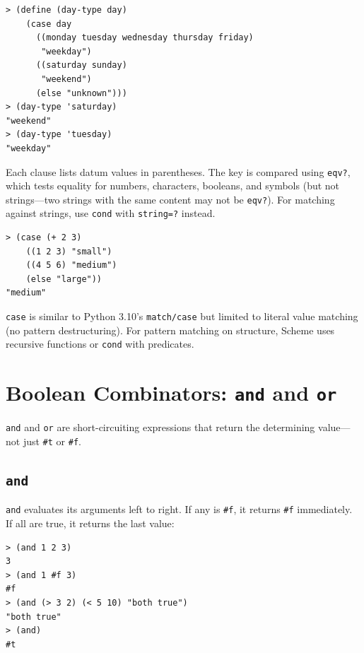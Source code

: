 \begin{lstlisting}[style=repl]
> (define (day-type day)
    (case day
      ((monday tuesday wednesday thursday friday)
       "weekday")
      ((saturday sunday)
       "weekend")
      (else "unknown")))
> (day-type 'saturday)
"weekend"
> (day-type 'tuesday)
"weekday"
\end{lstlisting}

Each clause lists datum values in parentheses. The key is compared using \texttt{eqv?}, which tests equality for numbers, characters, booleans, and symbols (but not strings---two strings with the same content may not be \texttt{eqv?}). For matching against strings, use \texttt{cond} with \texttt{string=?} instead.

\begin{lstlisting}[style=repl]
> (case (+ 2 3)
    ((1 2 3) "small")
    ((4 5 6) "medium")
    (else "large"))
"medium"
\end{lstlisting}

\begin{note}
\texttt{case} is similar to Python 3.10's \texttt{match/case} but limited to literal value matching (no pattern destructuring). For pattern matching on structure, Scheme uses recursive functions or \texttt{cond} with predicates.
\end{note}

\section{Boolean Combinators: \texttt{and} and \texttt{or}}

\texttt{and} and \texttt{or} are short-circuiting expressions that return the determining value---not just \texttt{\#t} or \texttt{\#f}.

\subsection{\texttt{and}}

\texttt{and} evaluates its arguments left to right. If any is \texttt{\#f}, it returns \texttt{\#f} immediately. If all are true, it returns the last value:

\begin{lstlisting}[style=repl]
> (and 1 2 3)
3
> (and 1 #f 3)
#f
> (and (> 3 2) (< 5 10) "both true")
"both true"
> (and)
#t
\end{lstlisting}

